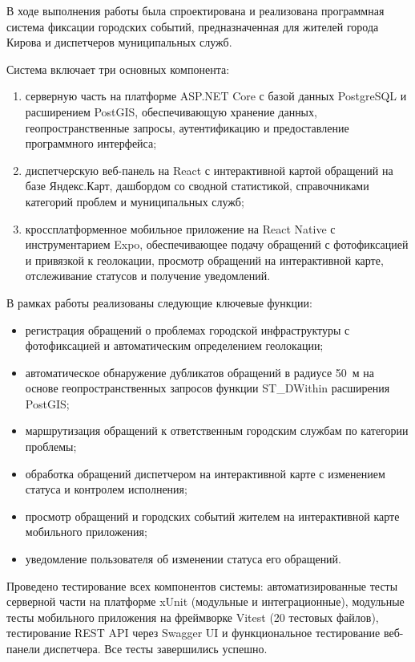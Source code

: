 В ходе выполнения работы была спроектирована и реализована программная система фиксации городских событий, предназначенная для жителей города Кирова и диспетчеров муниципальных служб.

Система включает три основных компонента:
\begin{enumerate}
    \item серверную часть на платформе ASP.NET Core с базой данных PostgreSQL и расширением PostGIS, обеспечивающую хранение данных, геопространственные запросы, аутентификацию и предоставление программного интерфейса;
    \item диспетчерскую веб-панель на React с интерактивной картой обращений на базе Яндекс.Карт, дашбордом со сводной статистикой, справочниками категорий проблем и муниципальных служб;
    \item кроссплатформенное мобильное приложение на React Native с инструментарием Expo, обеспечивающее подачу обращений с фотофиксацией и привязкой к геолокации, просмотр обращений на интерактивной карте, отслеживание статусов и получение уведомлений.
\end{enumerate}

В рамках работы реализованы следующие ключевые функции:
\begin{itemize}
    \item регистрация обращений о проблемах городской инфраструктуры с фотофиксацией и автоматическим определением геолокации;
    \item автоматическое обнаружение дубликатов обращений в радиусе 50~м на основе геопространственных запросов функции ST\_DWithin расширения PostGIS;
    \item маршрутизация обращений к ответственным городским службам по категории проблемы;
    \item обработка обращений диспетчером на интерактивной карте с изменением статуса и контролем исполнения;
    \item просмотр обращений и городских событий жителем на интерактивной карте мобильного приложения;
    \item уведомление пользователя об изменении статуса его обращений.
\end{itemize}

Проведено тестирование всех компонентов системы: автоматизированные тесты серверной части на платформе xUnit (модульные и интеграционные), модульные тесты мобильного приложения на фреймворке Vitest (20 тестовых файлов), тестирование REST API через Swagger UI и функциональное тестирование веб-панели диспетчера. Все тесты завершились успешно.

